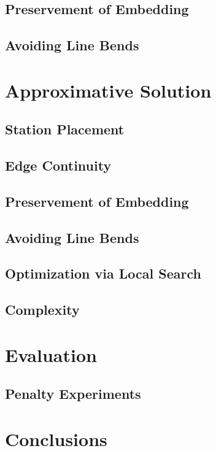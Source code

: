 \documentclass{sig-alternate-sigmod09}
\begin{document}
\subsection{Preservement of Embedding}

\subsection{Avoiding Line Bends}

\section{Approximative Solution}

\subsection{Station Placement}

\subsection{Edge Continuity}

\subsection{Preservement of Embedding}

\subsection{Avoiding Line Bends}

\subsection{Optimization via Local Search}

\subsection{Complexity}

\section{Evaluation}

\subsection{Penalty Experiments}

\section{Conclusions}


\balancecolumns
\end{document}
